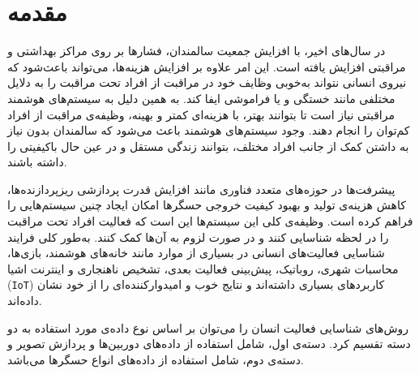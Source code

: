 \chapter{مقدمه}
\clearpage

در سال‌های اخیر، با افزایش جمعیت سالمندان، فشارها بر روی مراکز بهداشتی و مراقبتی افزایش یافته است. این امر علاوه بر افزایش هزینه‌ها، می‌تواند باعث‌شود که نیروی انسانی نتواند به‌خوبی وظایف خود در مراقبت از افراد تحت مراقبت را به دلایل مختلفی مانند خستگی و یا فراموشی ایفا کند. به همین دلیل به سیستم‌های هوشمند مراقبتی نیاز است تا بتوانند بهتر، با هزینه‌ای کمتر و بهینه، وظیفه‌ی مراقبت از افراد کم‌توان را انجام دهند. وجود سیستم‌های هوشمند باعث می‌شود که سالمندان بدون نیاز به داشتن کمک از جانب افراد مختلف، بتوانند زندگی مستقل و در عین حال باکیفیتی را داشته باشند\cite{zhu2015wearable}.

پیشرفت‌ها در حوزه‌های متعدد فناوری مانند افزایش قدرت پردازشی ریزپردازنده‌ها، کاهش هزینه‌ی تولید و بهبود کیفیت خروجی حسگرها امکان ایجاد چنین سیستم‌هایی را فراهم کرده است. وظیفه‌ی کلی این سیستم‌ها این است که فعالیت افراد تحت مراقبت را در لحظه شناسایی کنند و در صورت لزوم به آن‌ها کمک کنند. به‌طور کلی فرایند شناسایی فعالیت‌های انسانی در بسیاری از موارد مانند خانه‌های هوشمند\cite{liao2014detecting}،
بازی‌ها\cite{almeida2017activity}،
محاسبات شهری\cite{zambonelli2011pervasive}،
روباتیک\cite{pereyda2019cyber}،
پیش‌بینی فعالیت بعدی\cite{alaghbari2022activities,jaouedi2020prediction}،
تشخیص ناهنجاری\cite{alaghbari2022activities,zhu2015wearable}
و اینترنت اشیا (\verb;IoT;)\cite{lu2018wearable}
کاربردهای بسیاری داشته‌اند و نتایج خوب و امیدوارکننده‌ای را از خود نشان داده‌اند.

روش‌های شناسایی فعالیت انسان
را می‌توان بر اساس نوع داده‌ی مورد استفاده به دو دسته تقسیم کرد. دسته‌ی اول، شامل استفاده از داده‌های دوربین‌ها و پردازش تصویر و دسته‌ی دوم، شامل استفاده از داده‌های انواع حسگرها می‌باشد.


